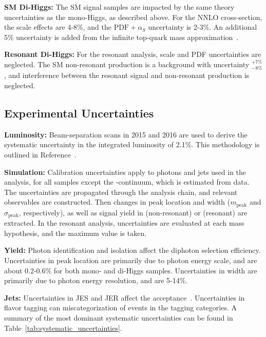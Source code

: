 \noindent\textbf{\gls{SM} Di-Higgs:} The \gls{SM} \hh signal samples are impacted by the same theory uncertainties as the mono-Higgs, as described above. For the \gls{NNLO} cross-section, the scale effects are 4-8\%, and the $\text{PDF}+\alpha_{S}$ uncertainty is 2-3\%. An additional 5\% uncertainty is added from the infinite top-quark mass approximation~\cite{nnlo-topquark}.

\noindent\textbf{Resonant Di-Higgs:} For the resonant analysis, scale and \gls{PDF} uncertainties are neglected. The \gls{SM} non-resonant \hh production is a background with uncertainty $^{+7\%}_{-8\%}$, and interference between the resonant \hh signal and non-resonant \hh production is neglected.

\subsection{Experimental Uncertainties}\label{ssec:exp-unc}

\noindent\textbf{Luminosity:} Beam-separation scans in 2015 and 2016 are used to derive the systematic uncertainty in the integrated luminosity of 2.1\%. This methodology is outlined in Reference~\cite{lumi-unc}.


\noindent\textbf{Simulation:} Calibration uncertainties apply to photons and jets used in the analysis, for all samples except the \yy-continuum, which is estimated from data. The uncertainties are propagated through the analysis chain, and relevant observables are constructed. Then changes in peak location and width ($m_{\text{peak}}$ and $\sigma_{\text{peak}}$, respectively), as well as signal yield in \myy (non-resonant) or \myybb (resonant) are extracted. In the resonant analysis, uncertainties are evaluated at each mass hypothesis, and the maximum value is taken.

\noindent\textbf{Yield:} Photon identification and isolation affect the diphoton selection efficiency. Uncertainties in peak location are primarily due to photon energy scale, and are about 0.2-0.6\% for both mono- and di-Higgs samples. Uncertainties in width are primarily due to photon energy resolution, and are 5-14\%. 

\noindent\textbf{Jets:} Uncertainties in \gls{JES} and \gls{JER} affect the \mbb acceptance~\cite{jes-uncertainty}.  Uncertainties in flavor tagging can miscategorization of events in the tagging categories. A summary of the most dominant systematic uncertainties can be found in Table~\ref{tab:systematic_uncertainties}.

